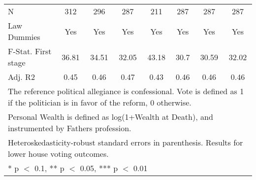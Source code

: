 \begin{table}
\begin{tabular}[t]{lccccccc}
\midrule
N & \num{312} & \num{296} & \num{287} & \num{211} & \num{287} & \num{287} & \num{287}\\
Law Dummies & Yes & Yes & Yes & Yes & Yes & Yes & Yes\\
F-Stat. First stage & 36.81 & 34.51 & 32.05 & 43.18 & 30.7 & 30.59 & 32.02\\
Adj. R2 & \num{0.45} & \num{0.46} & \num{0.47} & \num{0.43} & \num{0.46} & \num{0.46} & \num{0.46}\\
\bottomrule
\multicolumn{8}{l}{\rule{0pt}{1em}The reference political allegiance is confessional. Vote is defined as 1 if the politician is in favor of the reform, 0 otherwise.}\\
\multicolumn{8}{l}{\rule{0pt}{1em}Personal Wealth is defined as log(1+Wealth at Death), and instrumented by Fathers profession.}\\
\multicolumn{8}{l}{\rule{0pt}{1em}Heteroskedasticity-robust standard errors in parenthesis. Results for lower house voting outcomes.}\\
\multicolumn{8}{l}{\rule{0pt}{1em}* p $<$ 0.1, ** p $<$ 0.05, *** p $<$ 0.01}\\
\end{tabular}
\end{table}
